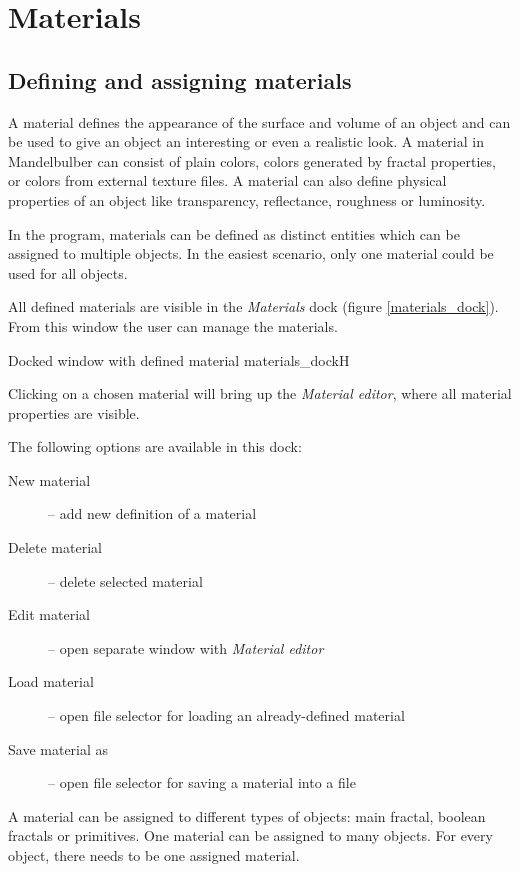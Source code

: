 \section{Materials}\label{materials}

\subsection{Defining and assigning materials}\label{defining-materials}

A material defines the appearance of the surface and volume of an object and can be used to give an object an interesting or even a realistic look. A material in Mandelbulber can consist of plain colors, colors generated by fractal properties, or colors from external texture files. A material can also define physical properties of an object like transparency, reflectance, roughness or luminosity.

In the program, materials can be defined as distinct entities which can be assigned to multiple objects. In the easiest scenario, only one material could be used for all objects.

All defined materials are visible in the \emph{Materials} dock (figure \ref{materials_dock}).
From this window the user can manage the materials.

{Docked window with defined material}
{materials_dock}{H}

Clicking on a chosen material will bring up the \emph{Material editor}, where all material properties are visible.

The following options are available in this dock:

\begin{description}
		\item[New material] -- add new definition of a material
		\item[Delete material] -- delete selected material
		\item[Edit material] -- open separate window with \emph{Material editor}
		\item[Load material] -- open file selector for loading an already-defined material
		\item[Save material as] -- open file selector for saving a material into a file
\end{description}

A material can be assigned to different types of objects: main fractal, boolean fractals or primitives. One material can be assigned to many objects. For every object, there needs to be one assigned material.
\pagebreak
